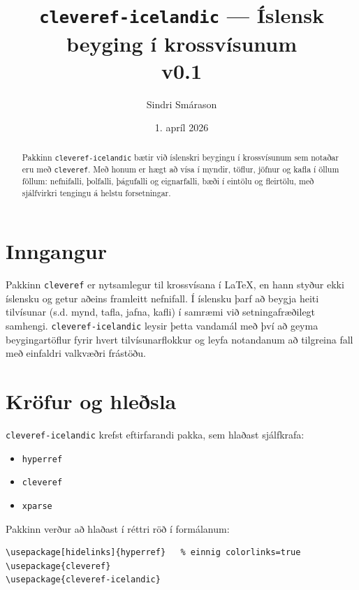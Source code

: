 \documentclass{article}
\title{\texttt{cleveref-icelandic} --- Íslensk beyging í krossvísunum\\
  \large v0.1}
\author{Sindri Smárason}
\date{1. apríl 2026}
\begin{document}
\maketitle

\begin{abstract}
  Pakkinn \texttt{cleveref-icelandic} bætir við íslenskri beygingu í krossvísunum
  sem notaðar eru með \texttt{cleveref}. Með honum er hægt að vísa í
  myndir, töflur, jöfnur og kafla í öllum föllum: nefnifalli, þolfalli,
  þágufalli og eignarfalli, bæði í eintölu og fleirtölu, með sjálfvirkri
  tengingu á helstu forsetningar.
\end{abstract}

\tableofcontents
\newpage

\section{Inngangur}

Pakkinn \texttt{cleveref} er nytsamlegur til krossvísana í LaTeX, en hann
styður ekki íslensku og getur aðeins framleitt nefnifall. Í íslensku
þarf að beygja heiti tilvísunar (s.d. mynd, tafla, jafna, kafli) í samræmi
við setningafræðilegt samhengi. \texttt{cleveref-icelandic} leysir þetta vandamál
með því að geyma beygingartöflur fyrir hvert tilvísunarflokkur og leyfa
notandanum að tilgreina fall með einfaldri valkvæðri frástöðu.

\section{Kröfur og hleðsla}

\texttt{cleveref-icelandic} krefst eftirfarandi pakka, sem hlaðast sjálfkrafa:

\begin{itemize}
  \item \texttt{hyperref}
  \item \texttt{cleveref}
  \item \texttt{xparse}
\end{itemize}

Pakkinn verður að hlaðast í réttri röð í formálanum:

\begin{lstlisting}
\usepackage[hidelinks]{hyperref}   % einnig colorlinks=true
\usepackage{cleveref}
\usepackage{cleveref-icelandic}
\end{lstlisting}
\end{document}
